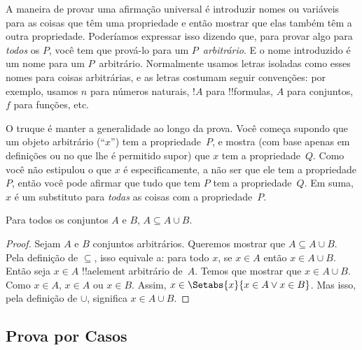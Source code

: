 \documentclass[../../../include/open-logic-section]{subfiles}
\begin{document}
A maneira de provar uma afirmação universal é introduzir nomes ou variáveis
para as coisas que têm uma propriedade e então mostrar que elas também
têm a outra propriedade.  Poderíamos expressar isso dizendo que, para provar
algo para \emph{todos} os $P$, você tem que prová-lo para um
$P$~\emph{arbitrário}. E o nome introduzido é um nome para um
$P$~arbitrário.  Normalmente usamos letras isoladas como esses nomes para
coisas arbitrárias, e as letras costumam seguir convenções: por exemplo,
usamos $n$ para números naturais, $!A$ para !!{formula}s, $A$ para conjuntos, $f$
para funções, etc.

O truque é manter a generalidade ao longo da prova. Você começa
supondo que um objeto arbitrário (``$x$'') tem a propriedade~$P$, e
mostra (com base apenas em definições ou no que lhe é permitido supor)
que $x$ tem a propriedade~$Q$. Como você não estipulou o que
$x$ é especificamente, a não ser que ele tem a propriedade $P$, então você pode
afirmar que tudo que tem $P$ tem a propriedade~$Q$. Em suma, $x$ é um
substituto para \emph{todas} as coisas com a propriedade~$P$.

\begin{prop}
  Para todos os conjuntos $A$ e $B$, $A \subseteq A \cup B$.
\end{prop}

\begin{proof}
  Sejam $A$ e $B$ conjuntos arbitrários.  Queremos mostrar que $A
  \subseteq A \cup B$. Pela definição de $\subseteq$, isso equivale a:
  para todo $x$, se $x \in A$ então $x \in A \cup B$. Então seja $x \in A$
  !!a{element} arbitrário de~$A$. Temos que mostrar que $x \in A
  \cup B$. Como $x \in A$, $x \in A$ ou $x \in B$. Assim, $x \in
  \Setabs{x}{x \in A \lor x \in B}$. Mas isso, pela definição de $\cup
  $, significa $x \in A \cup B$.
\end{proof}


\subsection{Prova por Casos}
\end{document}
